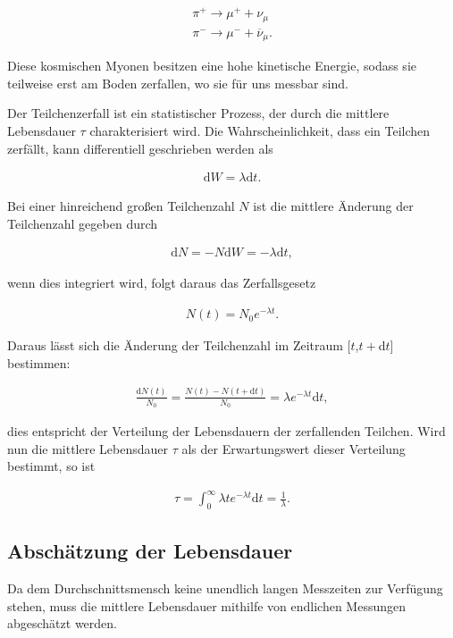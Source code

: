 \begin{align*}
	\pi^+ \rightarrow \mu^+ + \nu_\mu\\	
	\pi^- \rightarrow \mu^- + \overline{\nu}_\mu.
\end{align*}

Diese kosmischen Myonen besitzen eine hohe kinetische Energie, sodass sie teilweise erst am Boden zerfallen, wo sie f\"ur uns messbar sind. 

Der Teilchenzerfall ist ein statistischer Prozess, der durch die mittlere Lebensdauer $\tau$ charakterisiert wird. Die Wahrscheinlichkeit, dass ein Teilchen zerf\"allt, kann differentiell geschrieben werden als

\begin{align}
	\text{d}W = \lambda \text{d}t.
\end{align}

Bei einer hinreichend gro{\ss}en Teilchenzahl $N$ ist die mittlere \"Anderung der Teilchenzahl gegeben durch

\begin{align*}
	\text{d}N = - N \text{d}W = - \lambda \text{d}t,
\end{align*}

wenn dies integriert wird, folgt daraus das Zerfallsgesetz

\begin{align}
	N(t) = N_0 e^{-\lambda t}.
	\label{eq:zerfallsgesetz}
\end{align}

Daraus l\"asst sich die \"Anderung der Teilchenzahl im Zeitraum [$t$,$t+$d$t$] bestimmen:

\begin{align}
	\frac{\text{d}N(t)}{N_0} = \frac{N(t)-N(t+\text{d}t)}{N_0} = \lambda e^{-\lambda t}\text{d}t,
	\label{eq:lebensdauer}
\end{align}

dies entspricht der Verteilung der Lebensdauern der zerfallenden Teilchen. Wird nun die mittlere Lebensdauer $\tau$ als der Erwartungswert dieser Verteilung bestimmt, so ist

\begin{align}
	\tau = \int_{0}^{\infty} \lambda t e^{-\lambda t}\text{d}t = \frac{1}{\lambda}.
\end{align}

\subsection{Absch\"atzung der Lebensdauer}
Da dem Durchschnittsmensch keine unendlich langen Messzeiten zur Verf\"ugung stehen, muss die mittlere Lebensdauer mithilfe von endlichen Messungen abgesch\"atzt werden.

